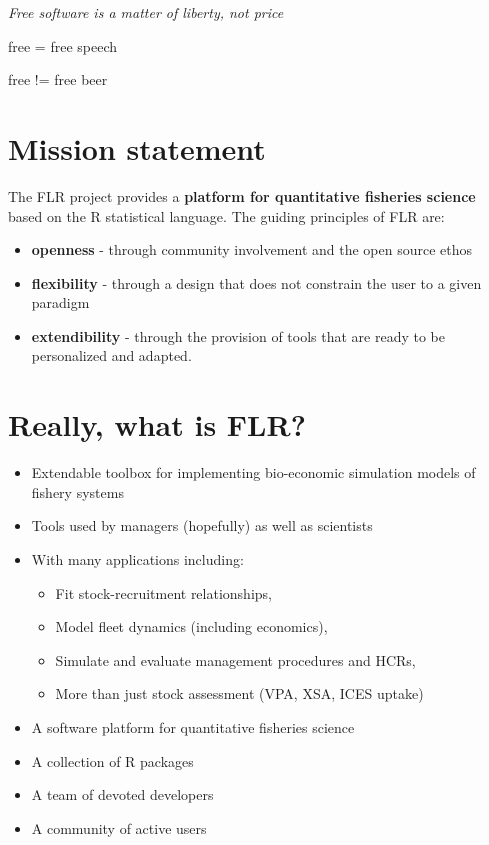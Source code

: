 \documentclass[]{article}
\providecommand{\tightlist}{%
  \setlength{\itemsep}{0pt}\setlength{\parskip}{0pt}}
\begin{document}
\centering

\emph{Free software is a matter of liberty, not price}

\medskip

\Huge{free = free speech}

\medskip

\Huge{free != free beer}

\section{Mission statement}\label{mission-statement}

The FLR project provides a \textbf{platform for quantitative fisheries
science} based on the R statistical language. The guiding principles of
FLR are:

\begin{itemize}
\tightlist
\item
  \textbf{openness} - through community involvement and the open source
  ethos
\item
  \textbf{flexibility} - through a design that does not constrain the
  user to a given paradigm
\item
  \textbf{extendibility} - through the provision of tools that are ready
  to be personalized and adapted.
\end{itemize}

\section{Really, what is FLR?}\label{really-what-is-flr}

\begin{itemize}
\tightlist
\item
  Extendable toolbox for implementing bio-economic simulation models of
  fishery systems
\item
  Tools used by managers (hopefully) as well as scientists
\item
  With many applications including:

  \begin{itemize}
  \tightlist
  \item
    Fit stock-recruitment relationships,
  \item
    Model fleet dynamics (including economics),
  \item
    Simulate and evaluate management procedures and HCRs,
  \item
    More than just stock assessment (VPA, XSA, ICES uptake)
  \end{itemize}
\item
  A software platform for quantitative fisheries science
\item
  A collection of R packages
\item
  A team of devoted developers
\item
  A community of active users
\end{itemize}
\end{document}

